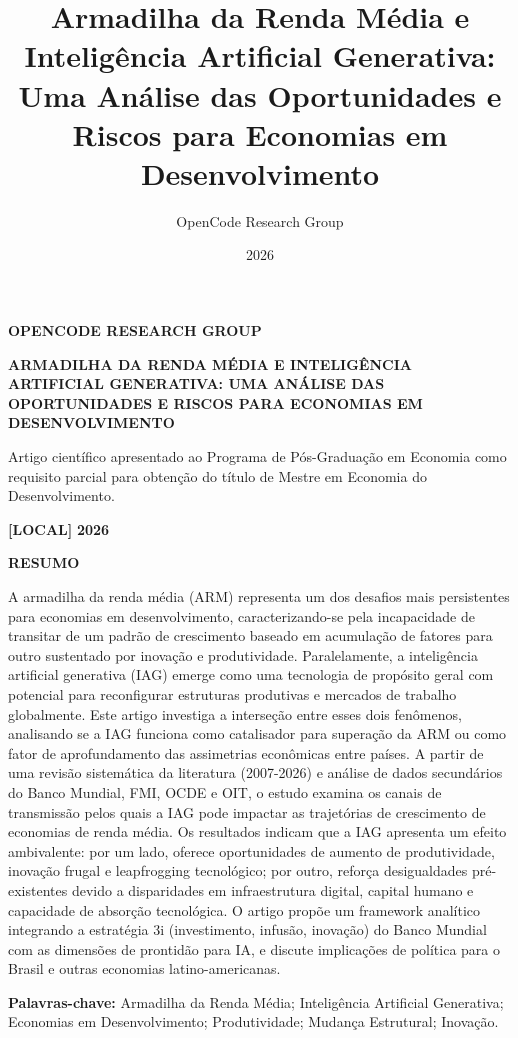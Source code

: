 \documentclass[
  brazilian,
  12pt,
]{article}
\title{Armadilha da Renda Média e Inteligência Artificial Generativa: Uma Análise das Oportunidades e Riscos para Economias em Desenvolvimento}
\author{OpenCode Research Group}
\date{2026}
\begin{document}
\maketitle

{
\setcounter{tocdepth}{3}
\tableofcontents
}
\textbf{OPENCODE RESEARCH GROUP}

\textbf{ARMADILHA DA RENDA MÉDIA E INTELIGÊNCIA ARTIFICIAL GENERATIVA: UMA ANÁLISE DAS OPORTUNIDADES E RISCOS PARA ECONOMIAS EM DESENVOLVIMENTO}

Artigo científico apresentado ao Programa de Pós-Graduação em Economia como requisito parcial para obtenção do título de Mestre em Economia do Desenvolvimento.

\textbf{{[}LOCAL{]}}
\textbf{2026}

\newpage

\textbf{RESUMO}

A armadilha da renda média (ARM) representa um dos desafios mais persistentes para economias em desenvolvimento, caracterizando-se pela incapacidade de transitar de um padrão de crescimento baseado em acumulação de fatores para outro sustentado por inovação e produtividade. Paralelamente, a inteligência artificial generativa (IAG) emerge como uma tecnologia de propósito geral com potencial para reconfigurar estruturas produtivas e mercados de trabalho globalmente. Este artigo investiga a interseção entre esses dois fenômenos, analisando se a IAG funciona como catalisador para superação da ARM ou como fator de aprofundamento das assimetrias econômicas entre países. A partir de uma revisão sistemática da literatura (2007-2026) e análise de dados secundários do Banco Mundial, FMI, OCDE e OIT, o estudo examina os canais de transmissão pelos quais a IAG pode impactar as trajetórias de crescimento de economias de renda média. Os resultados indicam que a IAG apresenta um efeito ambivalente: por um lado, oferece oportunidades de aumento de produtividade, inovação frugal e leapfrogging tecnológico; por outro, reforça desigualdades pré-existentes devido a disparidades em infraestrutura digital, capital humano e capacidade de absorção tecnológica. O artigo propõe um framework analítico integrando a estratégia 3i (investimento, infusão, inovação) do Banco Mundial com as dimensões de prontidão para IA, e discute implicações de política para o Brasil e outras economias latino-americanas.

\textbf{Palavras-chave:} Armadilha da Renda Média; Inteligência Artificial Generativa; Economias em Desenvolvimento; Produtividade; Mudança Estrutural; Inovação.
\end{document}
